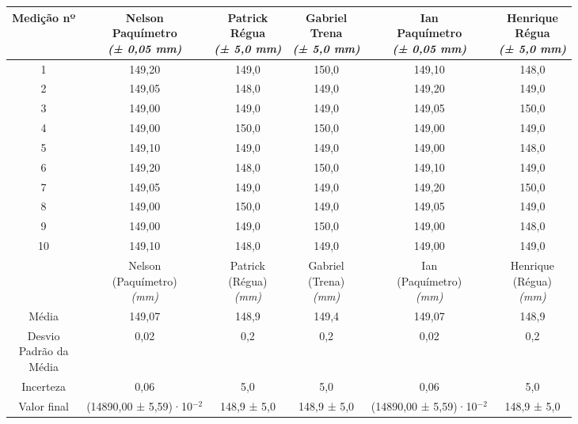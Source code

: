 \documentclass{article}
\begin{document}
\begin{table}[h!]
\centering
\begin{tabular}{c c c c c c }
\toprule
Medição nº & \shortstack{Nelson\\Paquímetro\\\textit{(± 0,05 mm)}} & \shortstack{Patrick\\Régua\\\textit{(± 5,0 mm)}} & \shortstack{Gabriel\\Trena\\\textit{(± 5,0 mm)}} & \shortstack{Ian\\Paquímetro\\\textit{(± 0,05 mm)}} & \shortstack{Henrique\\Régua\\\textit{(± 5,0 mm)}}\\
\midrule
1 & 149,20 & 149,0 & 150,0 & 149,10 & 148,0\\
2 & 149,05 & 148,0 & 149,0 & 149,20 & 149,0\\
3 & 149,00 & 149,0 & 149,0 & 149,05 & 150,0\\
4 & 149,00 & 150,0 & 150,0 & 149,00 & 149,0\\
5 & 149,10 & 149,0 & 149,0 & 149,00 & 148,0\\
6 & 149,20 & 148,0 & 150,0 & 149,10 & 149,0\\
7 & 149,05 & 149,0 & 149,0 & 149,20 & 150,0\\
8 & 149,00 & 150,0 & 149,0 & 149,05 & 149,0\\
9 & 149,00 & 149,0 & 150,0 & 149,00 & 148,0\\
10 & 149,10 & 148,0 & 149,0 & 149,00 & 149,0\\
\midrule
&\shortstack{Nelson\\(Paquímetro)\\\textit{(mm)}} & \shortstack{Patrick\\(Régua)\\\textit{(mm)}} & \shortstack{Gabriel\\(Trena)\\\textit{(mm)}} & \shortstack{Ian\\(Paquímetro)\\\textit{(mm)}} & \shortstack{Henrique\\(Régua)\\\textit{(mm)}}\\
\midrule
Média & 149,07 & 148,9 & 149,4 & 149,07 & 148,9\\[3pt]
\shortstack{Desvio\\Padrão da\\Média} & 0,02 & 0,2 & 0,2 & 0,02 & 0,2\\[3pt]
Incerteza & 0,06 & 5,0 & 5,0 & 0,06 & 5,0\\[3pt]
Valor final & (14890,00 ± 5,59)·10$^{-2}$ & 148,9 ± 5,0 & 148,9 ± 5,0 & (14890,00 ± 5,59)·10$^{-2}$ & 148,9 ± 5,0\\[3pt]
\bottomrule
\end{tabular}
\end{table}
\end{document}

